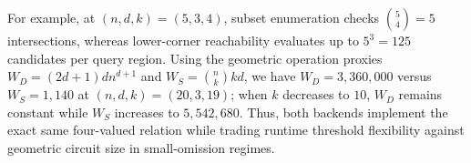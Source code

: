 For example, at $(n, d, k) = (5, 3, 4)$, subset enumeration checks $\binom{5}{4} = 5$ intersections, whereas lower-corner reachability evaluates up to $5^3 = 125$ candidates per query region. Using the geometric operation proxies $W_D = (2d + 1)dn^{d+1}$ and $W_S = \binom{n}{k}kd$, we have $W_D = 3,360,000$ versus $W_S = 1,140$ at $(n, d, k) = (20, 3, 19)$; when $k$ decreases to $10$, $W_D$ remains constant while $W_S$ increases to $5,542,680$. Thus, both backends implement the exact same four-valued relation while trading runtime threshold flexibility against geometric circuit size in small-omission regimes.
